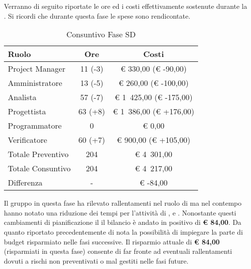 	Verranno di seguito riportate le ore ed i costi effettivamente sostenute durante la . Si ricordi che durante questa fase le spese sono rendicontate.
	\begin{table}[H]
		\begin{center}
			\begin{tabular}{| l | c | c |}
				\hline
				Ruolo 				& Ore 	& Costi  \\ \hline
				
				Project Manager		& 11 (-3) 		& \euro{} 330,00 (\euro{} -90,00)	\\
				Amministratore 		& 13 (-5)		& \euro{} 260,00 (\euro{} -100,00)	\\
				Analista	 		& 57 (-7)		& \euro{} 1~425,00 (\euro{} -175,00)	\\
				Progettista 		& 63 (+8)		& \euro{} 1~386,00  (\euro{} +176,00)	\\
				Programmatore		& 0				& \euro{} 0,00	\\
				Verificatore		& 60 (+7)		& \euro{} 900,00 (\euro{} +105,00)	\\ \hline \hline
					
				Totale Preventivo	& 204 			& \euro{} 4~301,00 	\\ \hline
				Totale Consuntivo	& 204 			& \euro{} 4~217,00 	\\ \hline
				Differenza			& - 			& \euro{} -84,00 	\\ \hline	
			\end{tabular}
		\end{center}
		\caption{Consuntivo Fase SD}
	\end{table}
			Il gruppo \groupname{} in questa fase ha rilevato rallentamenti nel ruolo di  ma nel contempo hanno notato una riduzione dei tempi per l'attività di ,  e . Nonostante questi cambiamenti di pianificazione il il bilancio è andato in positivo di \textbf{\euro{} 84,00}.
			Da quanto riportato precedentemente di nota la possibilità di impiegare la parte di budget risparmiato nelle fasi successive. Il risparmio attuale di \textbf{\euro{} 84,00} (risparmiati in questa fase) consente di far fronte ad eventuali rallentamenti dovuti a rischi non preventivati o mal gestiti nelle fasi future.

